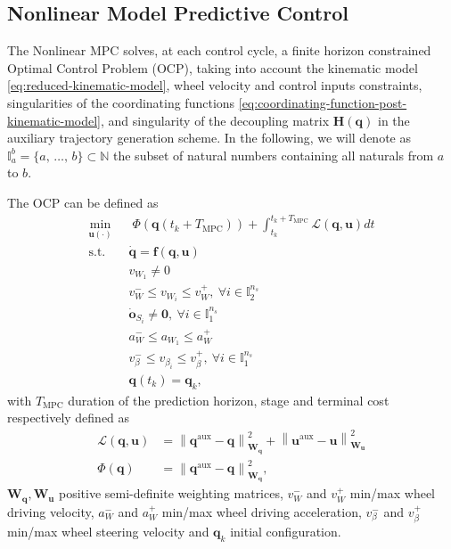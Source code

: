 \subsection{Nonlinear Model Predictive Control}
\label{sec:model-predictive-control}
The Nonlinear MPC solves, at each control cycle, a finite horizon constrained
Optimal Control Problem (OCP), taking into account the kinematic model
\eqref{eq:reduced-kinematic-model}, wheel velocity and control inputs
constraints, singularities of the coordinating functions
\eqref{eq:coordinating-function-post-kinematic-model}, and singularity of the
decoupling matrix $\bm{H}(\bm{q})$ in the auxiliary trajectory generation scheme.
In the following, we will denote as
$\mathbb{I}_a^b=\{a,\, \dots,\, b\}\subset\mathbb{N}$ the subset of natural
numbers containing all naturals from $a$ to $b$.

The OCP can be defined as 
\begin{equation*}
    \begin{aligned}
        \min_{\bm{u}(\cdot)} \;\;
            & \; \Phi(\bm{q}(t_k + T_{\mathrm{MPC}})) + \int_{t_k}^{t_k + T_{\mathrm{MPC}}} \mathcal{L}(\bm{q}, \bm{u}) dt \\
            \text{s.t. } & \dot{\bm{q}} = \bm{f}(\bm{q}, \bm{u}) \\
                         & v_{W_1} \ne 0 \\
                         & v_W^- \le v_{W_i} \le v_W^+,\:  \forall i \in \mathbb{I}_2^{n_s} \\
                         & \dot{\bm{o}}_{S_i} \ne \bm{0},\: \forall i \in \mathbb{I}_1^{n_s} \\
                         & a_W^- \le a_{W_1} \le a_W^+ \\
                         & v_{\beta}^- \le v_{\beta_i} \le v_{\beta}^+,\: \forall i \in \mathbb{I}_1^{n_s} \\
                         & \bm{q}(t_k) = \bm{q}_k,
    \end{aligned}
\end{equation*}
with $T_{\mathrm{MPC}}$ duration of the prediction horizon, stage and terminal
cost respectively defined as
\begin{align*}
    \mathcal{L}(\bm{q}, \bm{u}) &= \left\|\bm{q}^{\mathrm{aux}} - \bm{q}\right\|_{\bm{W_q}}^2 + \left\|\bm{u}^{\mathrm{aux}} - \bm{u}\right\|_{\bm{W_u}}^2 \\
    \Phi(\bm{q}) &= \left\|\bm{q}^{\mathrm{aux}} - \bm{q}\right\|_{\bm{W_q}}^2,
\end{align*}
$\bm{W_q}, \bm{W_u}$ positive semi-definite weighting matrices, $v_W^-$ and
$v_W^+$ min/max wheel driving velocity, $a_W^-$ and $a_W^+$ min/max wheel
driving acceleration, $v_{\beta}^-$ and $v_{\beta}^+$  min/max  wheel steering
velocity and $\bm{q}_k$ initial configuration.

